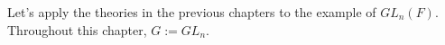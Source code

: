 \documentclass{article}
\newcommand{\red}[1]{\textcolor{red}{#1}}
\newcommand{\Perf}{\operatorname{Perf}}
\begin{document}
%	
%	
%	
%	
%	
%





Let's apply the theories in the previous chapters to the example of $GL_n(F)$. Throughout this chapter, $G:=GL_n$.
\end{document}
